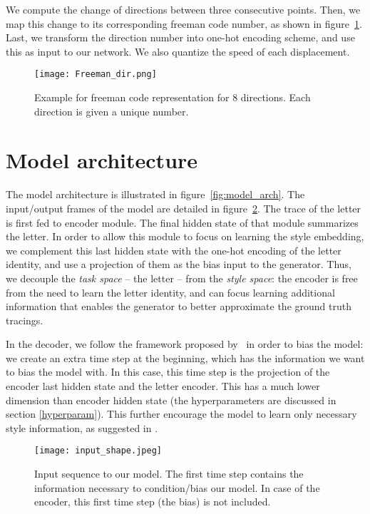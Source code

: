 \documentclass[conference]{IEEEtran}
\begin{document}
\par We compute the change of directions between three consecutive points. Then, we map this change to its corresponding freeman code number, as shown in figure~\ref{fig:freeman_dir}. Last, we transform the direction number into one-hot encoding scheme, and use this as input to our network. We also quantize the speed of each displacement.

\begin{figure}[htbp!]
\centering
\texttt{[image: Freeman\_dir.png]}
\caption{Example for freeman code representation for 8 directions. Each direction is given a unique number.}
\label{fig:freeman_dir}
\end{figure}

\section{Model architecture}
 \par The model architecture is illustrated in figure~\ref{fig:model_arch}. The input/output frames of the model are detailed in figure~\ref{fig:input_shape}. The trace of the letter is first fed to encoder module. The final hidden state of that module summarizes the letter. In order to allow this module to focus on learning the style embedding, we complement this last hidden state with the one-hot encoding of the letter identity, and use a projection of them as the bias input to the generator. Thus, we decouple the \textit{task space} -- the letter -- from the \textit{style space}: the encoder is free from the need to learn the letter identity, and can focus learning additional information that enables the generator to better approximate the ground truth tracings.
\par In the decoder, we follow the framework proposed by~\cite{vinyals2015show} in order to bias the model: we create an extra time step at the beginning, which has the information we want to bias the model with. In this case, this time step is the projection of the encoder last hidden state and the letter encoder. This has a much lower dimension than encoder hidden state (the hyperparameters are discussed in section \ref{hyperparam}). This further encourage the model to learn only necessary style information, as suggested in \cite{DBLP:journals/corr/abs-1803-09047}.

\begin{figure}[htbp!]
\centering
\texttt{[image: input\_shape.jpeg]}
\caption{Input sequence to our model. The first time step contains the information necessary to condition/bias our model. In case of the encoder, this first time step (the bias) is not included.}
\label{fig:input_shape}
\end{figure}
\end{document}
